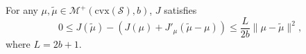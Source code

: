 \documentclass[stsy,sglanonrev]{informs4}
\begin{document}
\begin{APPENDICES}
\begin{lemma} For any $\mu,\tilde{\mu} \in \mathcal{M}^+(\mathrm{cvx}(\mathcal{S}), b)$, $J$ satisfies \begin{equation}\label{descentlemmagen} 0 \leq J(\tilde{\mu}) - \left( J(\mu) + J'_{\mu}(\tilde{\mu}-\mu) \right)  \leq  \frac{L}{2b}\|\mu-\tilde{\mu}\|^2, \end{equation}
where $L=2b+1$.
\end{lemma}


\end{APPENDICES}
\end{document}
